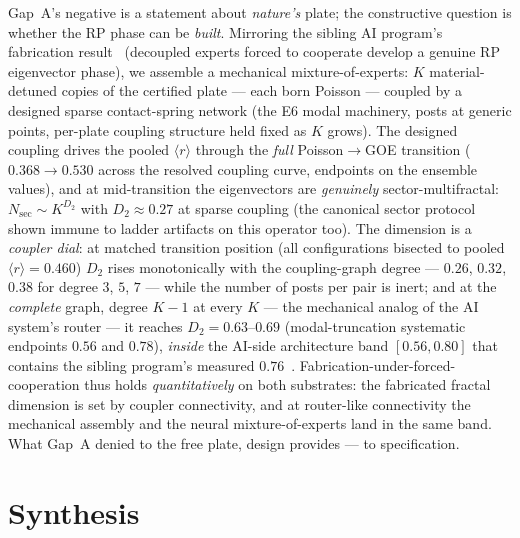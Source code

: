 \documentclass[11pt]{article}
\newcommand{\rmean}{\langle r \rangle}
\begin{document}
Gap~A's negative is a statement about \emph{nature's} plate; the
constructive question is whether the RP phase can be \emph{built}.
Mirroring the sibling AI program's fabrication result~\cite{ornelasRMT2026}
(decoupled experts
forced to cooperate develop a genuine RP eigenvector phase), we assemble
a mechanical mixture-of-experts: $K$ material-detuned copies of the
certified plate --- each born Poisson --- coupled by a designed sparse
contact-spring network (the E6 modal machinery, posts at generic
points, per-plate coupling structure held fixed as $K$ grows). The
designed coupling drives the pooled $\rmean$ through the \emph{full}
Poisson$\to$GOE transition ($0.368\to0.530$ across the resolved
coupling curve, endpoints on the ensemble values), and at
mid-transition the eigenvectors are \emph{genuinely}
sector-multifractal: $N_{\mathrm{sec}}\sim K^{D_2}$ with
$D_2\approx0.27$ at sparse coupling (the canonical sector protocol
shown immune to ladder artifacts on this operator too). The dimension
is a \emph{coupler dial}: at matched transition position (all
configurations bisected to pooled $\rmean = 0.460$) $D_2$ rises
monotonically with the coupling-graph degree --- $0.26$, $0.32$, $0.38$
for degree $3$, $5$, $7$ --- while the number of posts per pair is
inert; and at the \emph{complete} graph, degree $K-1$ at every $K$ ---
the mechanical analog of the AI system's router --- it reaches
$D_2 = 0.63$--$0.69$ (modal-truncation systematic endpoints $0.56$ and
$0.78$), \emph{inside} the AI-side architecture band $[0.56, 0.80]$
that contains the sibling program's measured $0.76$~\cite{ornelasRMT2026}.
Fabrication-under-forced-cooperation thus holds \emph{quantitatively}
on both substrates: the fabricated fractal dimension is set by coupler
connectivity, and at router-like connectivity the mechanical assembly
and the neural mixture-of-experts land in the same band. What Gap~A
denied to the free plate, design provides --- to specification.

\section{Synthesis}
\end{document}

